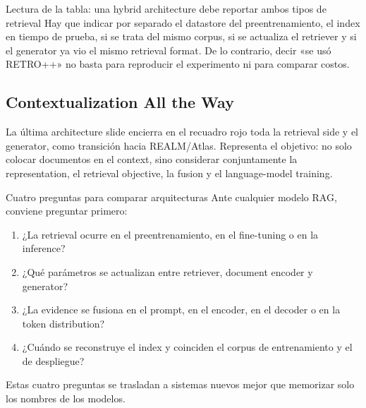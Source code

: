 
\begin{knowledgebox}{Lectura de la tabla: una hybrid architecture debe reportar ambos tipos de retrieval}
Hay que indicar por separado el datastore del preentrenamiento, el index en tiempo de prueba, si se trata del mismo corpus, si se actualiza el retriever y si el generator ya vio el mismo retrieval format. De lo contrario, decir «se usó RETRO++» no basta para reproducir el experimento ni para comparar costos.
\end{knowledgebox}

\subsection{Contextualization All the Way}

La última architecture slide encierra en el recuadro rojo toda la retrieval side y el generator, como transición hacia REALM/Atlas. Representa el objetivo: no solo colocar documentos en el context, sino considerar conjuntamente la representation, el retrieval objective, la fusion y el language-model training.


\begin{importantbox}{Cuatro preguntas para comparar arquitecturas}
Ante cualquier modelo RAG, conviene preguntar primero:
\begin{enumerate}
  \item ¿La retrieval ocurre en el preentrenamiento, en el fine-tuning o en la inference?
  \item ¿Qué parámetros se actualizan entre retriever, document encoder y generator?
  \item ¿La evidence se fusiona en el prompt, en el encoder, en el decoder o en la token distribution?
  \item ¿Cuándo se reconstruye el index y coinciden el corpus de entrenamiento y el de despliegue?
\end{enumerate}
Estas cuatro preguntas se trasladan a sistemas nuevos mejor que memorizar solo los nombres de los modelos.
\end{importantbox}


